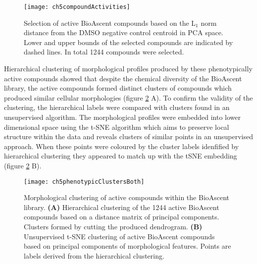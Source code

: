 \documentclass[a4paper,11pt,twoside,openright]{scrbook}
\begin{document}
\begin{figure}
    \captionsetup{width=0.8\textwidth}
    \caption[Selecting active compounds based on distance]{
Selection of active BioAscent compounds based on the L$_1$ norm distance from the DMSO negative control centroid in PCA space.
Lower and upper bounds of the selected compounds are indicated by dashed lines. In total 1244 compounds were selected.}
    \texttt{[image: ch5compoundActivities]}
    \label{figure:compound_activity}
\end{figure}

Hierarchical clustering of morphological profiles produced by these phenotypically active compounds showed that despite the chemical diversity of the BioAscent library, the active compounds formed distinct clusters of compounds which produced similar cellular morphologies (figure \ref{figure:morph_cluster} A).
To confirm the validity of the clustering, the hierarchical labels were compared with clusters found in an unsupervised algorithm.
The morphological profiles were embedded into lower dimensional space using the t-SNE algorithm \cite{Maaten2008} which aims to preserve local structure within the data and reveals clusters of similar points in an unsupervised approach.
When these points were coloured by the cluster labels idenfified by hierarchical clustering they appeared to match up with the tSNE embedding (figure \ref{figure:morph_cluster} B).

\begin{figure}
    \captionsetup{width=0.8\textwidth}
    \caption[Morphological clustering of the BioAscent library]{
Morphological clustering of active compounds within the BioAscent library.
    \textbf{(A)} Hierarchical clustering of the 1244 active BioAscent compounds based on a distance matrix of principal components.
    Clusters formed by cutting the produced dendrogram.
    \textbf{(B)} Unsupervised t-SNE clustering of active BioAscent compounds based on principal components of morphological features.
    Points are labels derived from the hierarchical clustering.
}
    \texttt{[image: ch5phenotypicClustersBoth]}
    \label{figure:morph_cluster}
\end{figure}
\end{document}
